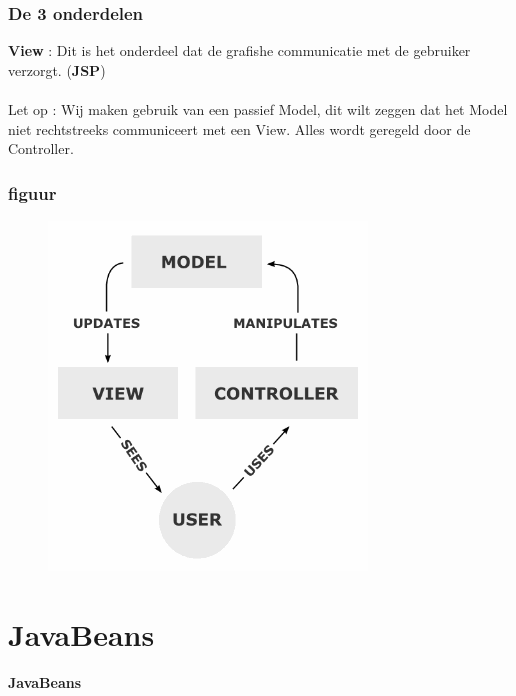 \documentclass{beamer}
\begin{document}
\begin{frame}

\frametitle{De 3 onderdelen}

{\Large \textbf{View} : Dit is het onderdeel dat de grafishe communicatie met de gebruiker verzorgt. (\textbf{JSP})\\~\\

Let op : Wij maken gebruik van een passief Model, dit wilt zeggen dat het 
Model niet rechtstreeks communiceert met een View. Alles wordt geregeld door de Controller.}

\end{frame}


\begin{frame}

\frametitle{figuur}

\begin{figure}

\includegraphics[scale=0.5]{MVC-Process}

\end{figure}

\end{frame}


\section{JavaBeans}


\begin{frame}

\begin{center}
\textbf{{\Huge JavaBeans}}
\end{center}

\end{frame}
\end{document}
